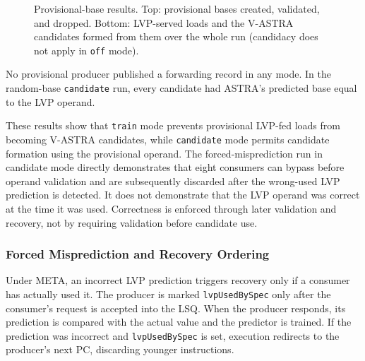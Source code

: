 \begin{figure}[H]
    \vspace{0.2em}


    \caption{Provisional-base results. Top: provisional bases
    created, validated, and dropped. Bottom: LVP-served loads
    and the V-ASTRA candidates formed from them over the whole run
    (candidacy does not apply in \texttt{off} mode).}
    \label{tab:meta-provisional-results}
\end{figure}

No provisional producer published a forwarding record in any mode. In
the random-base \texttt{candidate} run, every candidate had ASTRA's
predicted base equal to the LVP operand.

These results show that \texttt{train} mode prevents provisional
LVP-fed loads from becoming V-ASTRA candidates, while
\texttt{candidate} mode permits candidate formation using the
provisional operand. The forced-misprediction run in candidate mode
directly demonstrates that
eight consumers can bypass before operand validation and are
subsequently discarded after the wrong-used LVP prediction is
detected. It does not demonstrate that the LVP operand was correct at
the time it was used. Correctness is enforced through later validation
and recovery, not by requiring validation before candidate use.

\subsubsection{Forced Misprediction and Recovery Ordering}
\label{subsubsec:meta-forced-misprediction-recovery}

Under META, an incorrect LVP prediction triggers recovery only if a
consumer has actually used it. The producer is marked
\texttt{lvpUsedBySpec} only after the consumer's request is accepted
into the LSQ. When the producer responds, its prediction is compared
with the actual value and the predictor is trained. If the prediction
was incorrect and \texttt{lvpUsedBySpec} is set, execution redirects
to the producer's next PC, discarding younger instructions.

